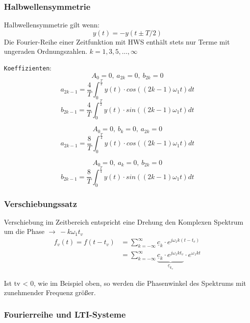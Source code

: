 \subsubsection{Halbwellensymmetrie}
Halbwellensymmetrie gilt wenn:
\[
	y(t) = -y(t \pm T/2)
\]
Die Fourier-Reihe einer Zeitfunktion mit HWS enthält stets
nur Terme mit ungeraden Ordnungszahlen. $k=1,3,5,\dots,\infty$
\begin{mdframed}[style=exercise,frametitle=im Allgemeinen]
	\texttt{\footnotesize Koeffizienten}:\\
	\[
		A_0 = 0,\
		a_{2k} = 0,\
		b_{2k} = 0
	\]
	$$a_{2k-1} = \frac{4}{T}\int^{\frac{T}{2}}_{0}y(t)\cdot cos((2k-1)\omega_1t)dt$$
	$$b_{2k-1} = \frac{4}{T}\int^{\frac{T}{2}}_{0}y(t)\cdot sin((2k-1)\omega_1t)dt$$
\end{mdframed}
\begin{mdframed}[style=exercise,frametitle=gerade Halbwellensymmetrie]
	\[
		A_0 = 0,\
		b_k = 0,\
		a_{2k} = 0
	\]
	$$a_{2k-1} = \frac{8}{T}\int^{\frac{T}{4}}_{0}y(t)\cdot cos((2k-1)\omega_1t)dt$$
\end{mdframed}
\begin{mdframed}[style=exercise,frametitle=ungerade Halbwellensymmetrie]
	\[
		A_0 = 0,\
		a_k = 0,\
		b_{2k} = 0
	\]
	$$b_{2k-1} = \frac{8}{T}\int^{\frac{T}{4}}_{0}y(t)\cdot sin((2k-1)\omega_1t)dt$$
\end{mdframed}

\subsubsection{Verschiebungssatz}
Verschiebung im Zeitbereich entspricht eine Drehung den Komplexen Spektrum um
die Phase $\rightarrow\ -k\omega_1 t_v$
\begin{align*}
	f_v(t) = f(t-t_v) & = \sum_{k=-\infty}^{\infty} \underline{c}_k\cdot e^{j\omega_1 k (t-t_v)}                                                       \\
	                  & = \sum_{k=-\infty}^{\infty} \underbrace{\underline{c}_k\cdot e^{j\omega_1 k t_v}}_{\underline{c}_{k_v}} \cdot e^{\omega_1 k t}
\end{align*}

Ist tv < 0, wie im Beispiel oben, so werden die Phasenwinkel des Spektrums mit
zunehmender Frequenz größer.

\subsubsection{Fourierreihe und LTI-Systeme}

